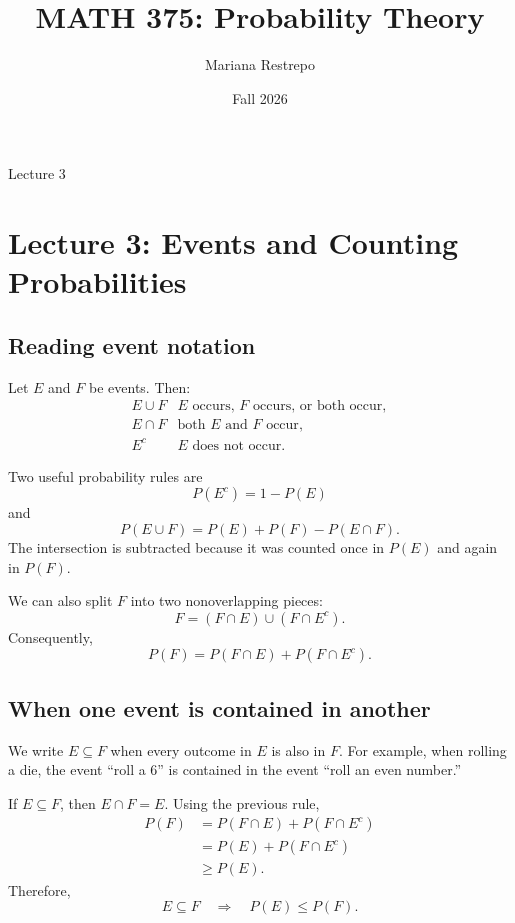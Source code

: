 \documentclass[11pt]{article}
\title{MATH 375: Probability Theory}
\author{Mariana Restrepo}
\date{Fall 2026}
\begin{document}
\maketitle

\begin{center}
\large Lecture 3
\end{center}

\tableofcontents

\section{Lecture 3: Events and Counting Probabilities}

\subsection{Reading event notation}

Let $E$ and $F$ be events. Then:
\[
\begin{array}{ll}
E\cup F & \text{$E$ occurs, $F$ occurs, or both occur},\\[2pt]
E\cap F & \text{both $E$ and $F$ occur},\\[2pt]
E^c & \text{$E$ does not occur}.
\end{array}
\]

Two useful probability rules are
\[
P(E^c)=1-P(E)
\]
and
\[
P(E\cup F)=P(E)+P(F)-P(E\cap F).
\]
The intersection is subtracted because it was counted once in
$P(E)$ and again in $P(F)$.

We can also split $F$ into two nonoverlapping pieces:
\[
F=(F\cap E)\cup(F\cap E^c).
\]
Consequently,
\[
P(F)=P(F\cap E)+P(F\cap E^c).
\]

\subsection{When one event is contained in another}

We write $E\subseteq F$ when every outcome in $E$ is also in $F$.
For example, when rolling a die, the event ``roll a 6'' is contained
in the event ``roll an even number.''

If $E\subseteq F$, then $E\cap F=E$. Using the previous rule,
\[
\begin{aligned}
P(F)
&=P(F\cap E)+P(F\cap E^c)\\
&=P(E)+P(F\cap E^c)\\
&\geq P(E).
\end{aligned}
\]
Therefore,
\[
\boxed{E\subseteq F\quad\Longrightarrow\quad P(E)\leq P(F).}
\]
\end{document}
